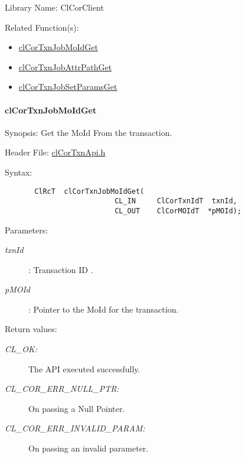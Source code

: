 \begin{Desc}
\item[Library Name:]Cl\-Cor\-Client\end{Desc}
\begin{Desc}
\item[Related Function(s):]\begin{itemize}
\item \hyperlink{group__group13}{cl\-Cor\-Txn\-Job\-Mo\-Id\-Get} \item \hyperlink{group__group13}{cl\-Cor\-Txn\-Job\-Attr\-Path\-Get} \item \hyperlink{group__group13}{cl\-Cor\-Txn\-Job\-Set\-Params\-Get} \end{itemize}
\end{Desc}
\hypertarget{pagecor510}{}\paragraph{cl\-Cor\-Txn\-Job\-Mo\-Id\-Get}\label{pagecor510}
\begin{Desc}
\item[Synopsis:]Get the Mo\-Id From the transaction.\end{Desc}
\begin{Desc}
\item[Header File:]\hyperlink{cl_cor_txn_api_8h}{cl\-Cor\-Txn\-Api.h}\end{Desc}
\begin{Desc}
\item[Syntax:]

\footnotesize\begin{verbatim}       ClRcT  clCorTxnJobMoIdGet(
                          CL_IN     ClCorTxnIdT  txnId,
                          CL_OUT    ClCorMOIdT  *pMOId);
\end{verbatim}
\normalsize
\end{Desc}
\begin{Desc}
\item[Parameters:]
\begin{description}
\item[{\em txn\-Id}]: Transaction ID . \item[{\em p\-MOId}]: Pointer to the Mo\-Id for the transaction.\end{description}
\end{Desc}
\begin{Desc}
\item[Return values:]
\begin{description}
\item[{\em CL\_\-OK:}]The API executed successfully. \item[{\em CL\_\-COR\_\-ERR\_\-NULL\_\-PTR:}]On passing a Null Pointer. \item[{\em CL\_\-COR\_\-ERR\_\-INVALID\_\-PARAM:}]On passing an invalid parameter.\end{description}
\end{Desc}

